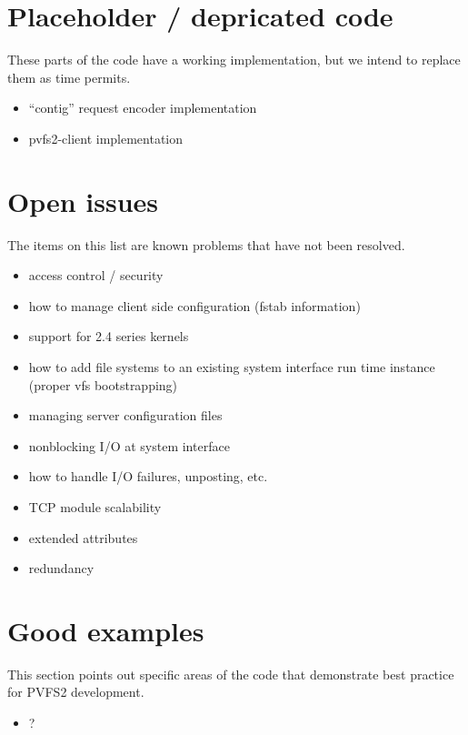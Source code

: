 \documentclass[11pt, letterpaper]{article}
\begin{document}
\section{Placeholder / depricated code}

These parts of the code have a working implementation, but we intend to
replace them as time permits.

\begin{itemize}
\item ``contig'' request encoder implementation
\item pvfs2-client implementation
\end{itemize}

\section{Open issues}

The items on this list are known problems that have not been resolved.

\begin{itemize}
\item access control / security
\item how to manage client side configuration (fstab information)
\item support for 2.4 series kernels
\item how to add file systems to an existing system interface run time instance (proper vfs bootstrapping)
\item managing server configuration files
\item nonblocking I/O at system interface
\item how to handle I/O failures, unposting, etc.
\item TCP module scalability
\item extended attributes
\item redundancy
\end{itemize}

\section{Good examples}

This section points out specific areas of the code that demonstrate 
best practice for PVFS2 development.

\begin{itemize}
\item ?
\end{itemize}
\end{document}
